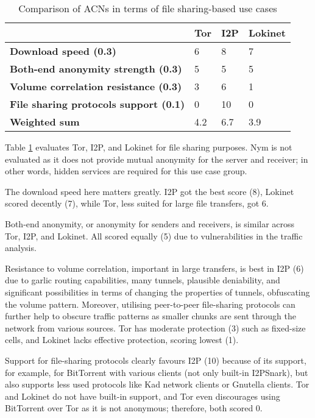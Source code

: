 \begin{table}[!ht]
\caption{Comparison of ACNs in terms of file sharing-based use cases}
\label{tab:file_sharing_uc}
\small
\begin{tabular}{|p{}|p{}|p{}|p{}|}
\hline
\textbf{} & \textbf{Tor} & \textbf{I2P} & \textbf{Lokinet} \\
\hline
\textbf{Download speed (0.3)} & 6 & 8 & 7 \\
\hline
\textbf{Both-end anonymity strength (0.3)} & 5 & 5 & 5 \\
\hline
\textbf{Volume correlation resistance (0.3)} & 3 & 6 & 1 \\
\hline
\textbf{File sharing protocols support (0.1)} & 0 & 10 & 0 \\
\hline
\textbf{Weighted sum} & 4.2 & 6.7 & 3.9 \\
\hline
\end{tabular}
\end{table}

Table \ref{tab:file_sharing_uc} evaluates Tor, I2P, and Lokinet for file sharing purposes. Nym is not evaluated as it does not provide mutual anonymity for the server and receiver; in other words, hidden services are required for this use case group.

The download speed here matters greatly. I2P got the best score (8), Lokinet scored decently (7), while Tor, less suited for large file transfers, got 6.

Both-end anonymity, or anonymity for senders and receivers, is similar across Tor, I2P, and Lokinet. All scored equally (5) due to vulnerabilities in the traffic analysis.

Resistance to volume correlation, important in large transfers, is best in I2P (6) due to garlic routing capabilities, many tunnels, plausible deniability, and significant possibilities in terms of changing the properties of tunnels, obfuscating the volume pattern. Moreover, utilising peer-to-peer file-sharing protocols can further help to obscure traffic patterns as smaller chunks are sent through the network from various sources. Tor has moderate protection (3) such as fixed-size cells, and Lokinet lacks effective protection, scoring lowest (1).

Support for file-sharing protocols clearly favours I2P (10) because of its support, for example, for BitTorrent with various clients (not only built-in I2PSnark), but also supports less used protocols like Kad network clients or Gnutella clients. Tor and Lokinet do not have built-in support, and Tor even discourages using BitTorrent over Tor as it is not anonymous; therefore, both scored 0.


